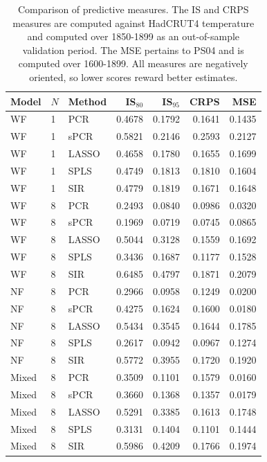 \documentclass[12pt]{amsart}
\theoremstyle{plain}
\theoremstyle{definition}
\theoremstyle{remark}
\begin{document}
\begin{table}[h!]
  \centering
  {\small
\begin{tabular}{lll|rrr|r}
  \toprule
  \textbf{Model} & $N$ & \textbf{Method} & IS$_{80}$ & IS$_{95}$ & CRPS & MSE \\
  \midrule
  WF & 1 & PCR & 0.4678 & 0.1792 & 0.1641 & 0.1435 \\ 
  WF & 1 & sPCR & 0.5821 & 0.2146 & 0.2593 & 0.2127 \\ 
  WF & 1 & LASSO & 0.4658 & 0.1780 & 0.1655 & 0.1699 \\ 
  WF & 1 & SPLS & 0.4749 & 0.1813 & 0.1810 & 0.1604 \\ 
  WF & 1 & SIR & 0.4779 & 0.1819 & 0.1671 & 0.1648 \\
  \midrule
  WF & 8 & PCR & 0.2493 & 0.0840 & 0.0986 & 0.0320 \\ 
  WF & 8 & sPCR & 0.1969 & 0.0719 & 0.0745 & 0.0865 \\ 
  WF & 8 & LASSO & 0.5044 & 0.3128 & 0.1559 & 0.1692 \\ 
  WF & 8 & SPLS & 0.3436 & 0.1687 & 0.1177 & 0.1528 \\ 
  WF & 8 & SIR & 0.6485 & 0.4797 & 0.1871 & 0.2079 \\
  \midrule
  NF & 8 & PCR & 0.2966 & 0.0958 & 0.1249 & 0.0200 \\ 
  NF & 8 & sPCR & 0.4275 & 0.1624 & 0.1600 & 0.0180 \\ 
  NF & 8 & LASSO & 0.5434 & 0.3545 & 0.1644 & 0.1785 \\ 
  NF & 8 & SPLS & 0.2617 & 0.0942 & 0.0967 & 0.1274 \\ 
  NF & 8 & SIR & 0.5772 & 0.3955 & 0.1720 & 0.1920 \\
  \midrule
  Mixed & 8 & PCR & 0.3509 & 0.1101 & 0.1579 & 0.0160 \\ 
  Mixed & 8 & sPCR & 0.3660 & 0.1368 & 0.1357 & 0.0179 \\ 
  Mixed & 8 & LASSO & 0.5291 & 0.3385 & 0.1613 & 0.1748 \\ 
  Mixed & 8 & SPLS & 0.3131 & 0.1404 & 0.1101 & 0.1444 \\ 
  Mixed & 8 & SIR & 0.5986 & 0.4209 & 0.1766 & 0.1974 \\  
  \bottomrule
\end{tabular}
}
\caption{Comparison of predictive measures. The IS and CRPS measures are computed against HadCRUT4 temperature and computed over 1850-1899 as an out-of-sample validation period. The MSE pertains to PS04 and is computed over 1600-1899. All measures are negatively oriented, so lower scores reward better estimates.}
\label{tab:comparisontot}
\end{table}
\end{document}

